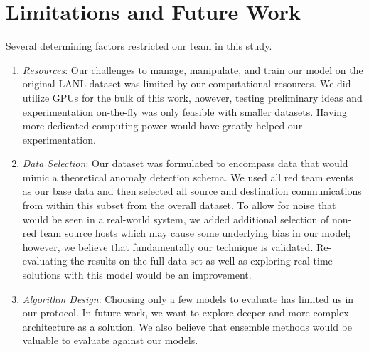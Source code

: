 \documentclass[sigconf]{acmart}
\begin{document}

\section{Limitations and Future Work}

Several determining factors restricted our team in this study.
\begin{enumerate}
  \item \textit{Resources}: Our challenges to manage, manipulate, and train our model on the original LANL dataset was limited by our computational resources. We did utilize GPUs for the bulk of this work,
  however, testing preliminary ideas and experimentation on-the-fly was only feasible with smaller datasets. Having more dedicated computing power would have greatly helped our experimentation.
  \item \textit{Data Selection}: Our dataset was formulated to encompass data that would mimic a theoretical anomaly detection schema. We used all red team events as our base data and then selected all source
  and destination communications from within this subset from the overall dataset. To allow for noise that would be seen in a real-world system, we added additional selection of non-red team source hosts which
  may cause some underlying bias in our model; however, we believe that fundamentally our technique is validated. Re-evaluating the results on the full data set as well as exploring real-time solutions with
  this model would be an improvement. 
  \item \textit{Algorithm Design}: Choosing only a few models to evaluate has limited us in our protocol. In future work, we want to explore deeper and more complex architecture as a solution. We also believe
  that ensemble methods would be valuable to evaluate against our models. 
\end{enumerate}
\end{document}
